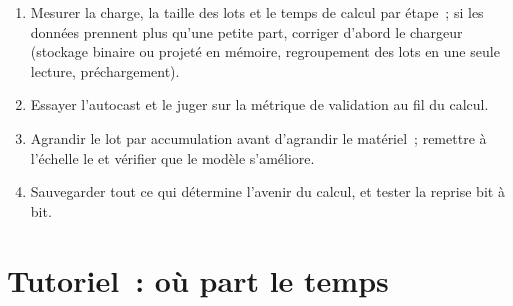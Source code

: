 \begin{method}\label{met:ml:train:method}
\begin{enumerate}
\item Mesurer la charge, la taille des lots et le temps de calcul par étape~; si les données prennent plus qu'une petite part, corriger d'abord le
chargeur (stockage binaire ou projeté en mémoire, regroupement des lots en une seule lecture, préchargement).
\item Essayer l'autocast  et le juger sur la métrique de validation au fil du calcul.
\item Agrandir le lot par accumulation avant d'agrandir le matériel~; remettre à l'échelle le  et vérifier que le modèle s'améliore.
\item Sauvegarder tout ce qui détermine l'avenir du calcul, et tester la reprise bit à bit.
\end{enumerate}
\end{method}

\section{Tutoriel~: où part le temps}\label{tut:ml:training-infrastructure:tut}

